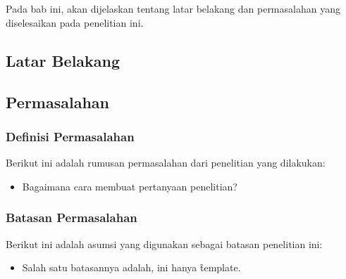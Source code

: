 \chapter{\babSatu}
Pada bab ini, akan dijelaskan tentang latar belakang dan permasalahan yang diselesaikan pada penelitian ini.


\section{Latar Belakang}

\section{Permasalahan}

\subsection{Definisi Permasalahan}
Berikut ini adalah rumusan permasalahan dari penelitian yang dilakukan:
\begin{itemize}
	\item Bagaimana cara membuat pertanyaan penelitian?
\end{itemize}


\subsection{Batasan Permasalahan}
Berikut ini adalah asumsi yang digunakan sebagai batasan penelitian ini:
\begin{itemize}
	\item Salah satu batasannya adalah, ini hanya \f{template}.
\end{itemize}



